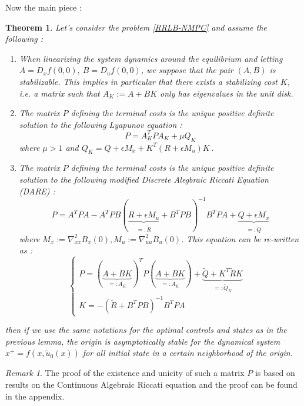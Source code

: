\documentclass[12pt]{article}
\newtheorem{theorem}{Theorem}[section]
\theoremstyle{definition}
\theoremstyle{remark}
\newtheorem*{remark}{Remark}
\newcommand{\inv}[1]{#1^{-1}}
\begin{document}
Now the main piece :

\begin{theorem}
	Let's consider the problem \ref{RRLB-NMPC} and assume the following :
	\begin{enumerate}
		\item When linearizing the system dynamics around the equilibrium and letting $A=D_xf(0,0),~B=D_uf(0,0)$, we suppose that the pair $(A,B)$ is stabilizable.
		This implies in particular that there exists a stabilizing cost $K$, i.e. a matrix such that $A_K:=A+BK$ only has eigenvalues in the unit disk.
		\item The matrix $P$ defining the terminal costs is the unique positive definite solution to the following Lyapunov equation :
		\begin{equation}
			P=A_K^TPA_K+\mu Q_K
		\end{equation}
		where $\mu>1$ and $Q_K=Q+\epsilon M_x+K^T(R+\epsilon M_u)K$\,.
		\item The matrix $P$ defining the terminal costs is the unique positive definite solution to the following modified Discrete Alegbraic Riccati Equation (DARE) :
		\begin{equation}
			\label{DARE}
			P=A^TPA-A^TPB\inv{(\underbrace{R+\epsilon M_u}_{=:\tilde{R}}+B^TPB)}B^TPA+\underbrace{Q+\epsilon M_x}_{=:\tilde{Q}}
		\end{equation}
		where $M_x:=\nabla_{xx}^2B_x(0),M_u:=\nabla_{uu}^2B_u(0)$.
		This equation can be re-written as :
		\begin{equation}
			\label{full-DARE}
			\begin{cases}
				P=(\underbrace{A+BK}_{=:A_K})^TP(\underbrace{A+BK}_{=:A_K})+\underbrace{\tilde{Q}+K^T\tilde{R}K}_{=:\tilde{Q}_K}&\\
				K=-\inv{(\tilde{R}+B^TPB)}B^TPA&
			\end{cases}
		\end{equation}
	\end{enumerate}	
	then if we use the same notations for the optimal controls and states as in the previous lemma, the origin is asymptotically stable for the dynamical system $x^+=f(x,\tilde{u}_0(x))$ for all initial state in a certain neighborhood of the origin.
\end{theorem}

\begin{remark}
	The proof of the existence and unicity of such a matrix $P$ is based on results on the Continuous Algebraic Riccati equation and the proof can be found in the appendix.
\end{remark}
\end{document}
